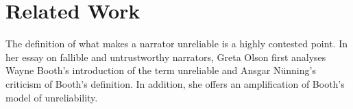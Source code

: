 \section{Related Work}
The definition of what makes a narrator unreliable is a highly contested point. In her essay on fallible and untrustworthy narrators, Greta Olson first analyses Wayne Booth's introduction of the term unreliable and Ansgar N\"unning's criticism of Booth's definition. In addition, she offers an amplification of Booth's model of unreliability\cite{Olson}.